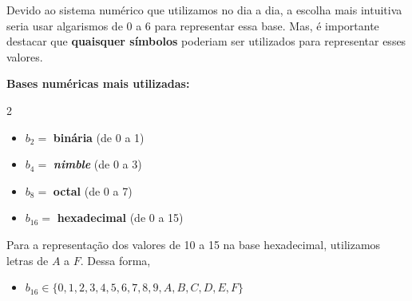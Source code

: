 \documentclass[12pt]{article}
\begin{document}
\begin{tcolorbox}[mynote, title= Observação]
Devido ao sistema numérico que utilizamos no dia a dia, a escolha mais intuitiva seria usar algarismos de 0 a 6 para representar essa base. Mas, é importante destacar que \textbf{quaisquer símbolos} poderiam ser utilizados para representar esses valores.
\end{tcolorbox}
\vspace{0.2cm}
\textbf{Bases numéricas mais utilizadas: }
\begin{multicols}{2}
\begin{itemize}
    \item $b_{2} =$ \textbf{binária} (de 0 a 1)
    \item $b_{4} =$ \textbf{\textit{nimble}} (de 0 a 3)
    \columnbreak
    \item $b_{8} =$ \textbf{octal } (de 0 a 7)
    \item $b_{16} =$ \textbf{hexadecimal} (de 0 a 15)
\end{itemize}
\end{multicols}
\noindent Para a representação dos valores de 10 a 15 na base hexadecimal, utilizamos letras de $A$ a $F$. Dessa forma,
\begin{itemize}
    \item $b_{16} \in \{0, 1, 2, 3, 4, 5, 6, 7, 8, 9, A, B, C, D, E, F\}$
\end{itemize}
\end{document}
